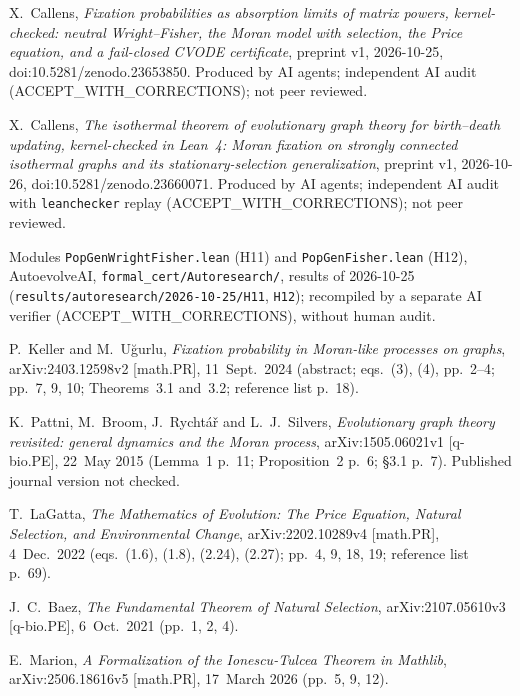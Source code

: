  X.~Callens, \emph{Fixation probabilities as absorption limits of matrix powers, kernel-checked:
neutral Wright--Fisher, the Moran model with selection, the Price equation, and a fail-closed CVODE certificate},
preprint v1, 2026-10-25, doi:10.5281/zenodo.23653850. Produced by AI agents; independent AI audit
(ACCEPT\_WITH\_CORRECTIONS); not peer reviewed.

 X.~Callens, \emph{The isothermal theorem of evolutionary graph theory for birth--death updating,
kernel-checked in Lean~4: Moran fixation on strongly connected isothermal graphs and its stationary-selection
generalization}, preprint v1, 2026-10-26, doi:10.5281/zenodo.23660071. Produced by AI agents; independent AI
audit with \texttt{leanchecker} replay (ACCEPT\_WITH\_CORRECTIONS); not peer reviewed.

 Modules \texttt{PopGenWrightFisher.lean} (H11) and \texttt{PopGenFisher.lean} (H12),
AutoevolveAI, \texttt{formal\_cert/Autoresearch/}, results of 2026-10-25
(\texttt{results/autoresearch/2026-10-25/H11}, \texttt{H12}); recompiled by a separate AI verifier
(ACCEPT\_WITH\_CORRECTIONS), without human audit.

 P.~Keller and M.~Uğurlu, \emph{Fixation probability in Moran-like processes on graphs},
arXiv:2403.12598v2 [math.PR], 11~Sept.\ 2024 (abstract; eqs.~(3), (4), pp.~2--4; pp.~7, 9, 10; Theorems~3.1
and~3.2; reference list p.~18).

 K.~Pattni, M.~Broom, J.~Rychtář and L.~J.~Silvers, \emph{Evolutionary graph theory revisited:
general dynamics and the Moran process}, arXiv:1505.06021v1 [q-bio.PE], 22~May 2015 (Lemma~1 p.~11;
Proposition~2 p.~6; §3.1 p.~7). Published journal version not checked.

 T.~LaGatta, \emph{The Mathematics of Evolution: The Price Equation, Natural Selection, and
Environmental Change}, arXiv:2202.10289v4 [math.PR], 4~Dec.\ 2022 (eqs.~(1.6), (1.8), (2.24), (2.27);
pp.~4, 9, 18, 19; reference list p.~69).

 J.~C.~Baez, \emph{The Fundamental Theorem of Natural Selection}, arXiv:2107.05610v3
[q-bio.PE], 6~Oct.\ 2021 (pp.~1, 2, 4).

 E.~Marion, \emph{A Formalization of the Ionescu-Tulcea Theorem in Mathlib},
arXiv:2506.18616v5 [math.PR], 17~March 2026 (pp.~5, 9, 12).


